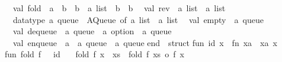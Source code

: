 \begin{isabellebody}
\begin{isamarkuptext}
\ \ val\ fold\ {}\ {}{}a\ {}{}\ {}b\ {}{}\ {}b{}\ {}{}\ {}a\ list\ {}{}\ {}b\ {}{}\ {}b\isanewline
\ \ val\ rev\ {}\ {}a\ list\ {}{}\ {}a\ list\isanewline
\ \ datatype\ {}a\ queue\ {}\ AQueue\ of\ {}a\ list\ {}\ {}a\ list\isanewline
\ \ val\ empty\ {}\ {}a\ queue\isanewline
\ \ val\ dequeue\ {}\ {}a\ queue\ {}{}\ {}a\ option\ {}\ {}a\ queue\isanewline
\ \ val\ enqueue\ {}\ {}a\ {}{}\ {}a\ queue\ {}{}\ {}a\ queue\isanewline
end\ {}\ struct\isanewline
\isanewline
fun\ id\ x\ {}\ {}fn\ xa\ {}{}\ xa{}\ x{}\isanewline
\isanewline
fun\ fold\ f\ {}{}\ {}\ id\isanewline
\ \ {}\ fold\ f\ {}x\ {}{}\ xs{}\ {}\ fold\ f\ xs\ o\ f\ x{}\isanewline
\isanewline

\end{isamarkuptext}
\end{isabellebody}
